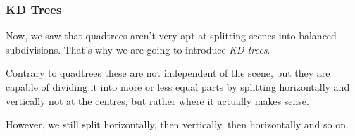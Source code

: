 \documentclass{panikzettel}
\begin{document}
\subsubsection*{KD Trees}

\begin{halfboxl}
Now, we saw that quadtrees aren't very apt at splitting scenes into balanced subdivisions. That's why we are going to introduce \emph{KD trees}.

Contrary to quadtrees these are not independent of the scene, but they are capable of dividing it into more or less equal parts by splitting horizontally and vertically not at the centres, but rather where it actually makes sense.

However, we still split horizontally, then vertically, then horizontally and so on.
\end{halfboxl}%
\end{document}
